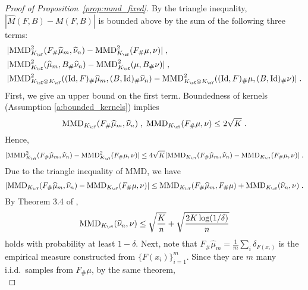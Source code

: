 \documentclass[11pt]{article}
\begin{document}
\begin{proof}[Proof of Proposition~\ref{prop:mmd_fixed}]
	By the triangle inequality, $|\widehat{M}(F, B) - M(F, B)|$ is bounded above by the sum of the following three terms:
	\begin{align*}
		& |\mathrm{MMD}^2_{K_{\cY}}(F_{\#}\widehat{\mu}_m, \widehat{\nu}_n) - \mathrm{MMD}^2_{K_{\cY}}(F_{\#}\mu, \nu)| \;, \\
		& |\mathrm{MMD}^2_{K_{\cX}}(\widehat{\mu}_m, B_{\#}\widehat{\nu}_n) - \mathrm{MMD}^2_{K_{\cX}}(\mu, B_{\#} \nu)| \;, \\
		& |\mathrm{MMD}^2_{K_{\cX} \otimes K_{\cY}} ((\mathrm{Id}, F)_{\#}\widehat{\mu}_m, (B, \mathrm{Id})_{\#} \widehat{\nu}_n) - \mathrm{MMD}^2_{K_{\cX} \otimes K_{\cY}} ((\mathrm{Id}, F)_{\#}\mu, (B, \mathrm{Id})_{\#} \nu)| \;.
	\end{align*}
	First, we give an upper bound on the first term. Boundedness of kernels (Assumption \ref{a:bounded_kernels}) implies
	\begin{equation*}
		\mathrm{MMD}_{K_{\cY}}(F_{\#}\widehat{\mu}_m, \widehat{\nu}_n) \;, \; \mathrm{MMD}_{K_{\cY}}(F_{\#}\mu, \nu) \le 2 \sqrt{K} \;.
	\end{equation*}
	Hence,
	\begin{equation*}
		|\mathrm{MMD}^2_{K_{\cY}}(F_{\#}\widehat{\mu}_m, \widehat{\nu}_n) - \mathrm{MMD}^2_{K_{\cY}}(F_{\#}\mu, \nu)| \le 4 \sqrt{K} |\mathrm{MMD}_{K_{\cY}}(F_{\#}\widehat{\mu}_m, \widehat{\nu}_n) - \mathrm{MMD}_{K_{\cY}}(F_{\#}\mu, \nu)|\;.
	\end{equation*}
	Due to the triangle inequality of MMD, we have
	\begin{equation*}
		|\mathrm{MMD}_{K_{\cY}}(F_{\#}\widehat{\mu}_m, \widehat{\nu}_n) - \mathrm{MMD}_{K_{\cY}}(F_{\#}\mu, \nu)|
		\le \mathrm{MMD}_{K_{\cY}}(F_{\#}\widehat{\mu}_{m}, F_{\#}\mu) + \mathrm{MMD}_{K_{\cY}}(\widehat{\nu}_n, \nu)\;.
	\end{equation*}
	By Theorem 3.4 of \cite{muandet_fukumizu_sriperumbudur_scholkopf_2017},
	\begin{equation*}
		\mathrm{MMD}_{K_{\cY}}(\widehat{\nu}_n, \nu) \le \sqrt{\frac{K}{n}} + \sqrt{\frac{2 K \log(1/\delta)}{n}}
	\end{equation*}
	holds with probability at least $1 - \delta$. Next, note that $F_{\#}\widehat{\mu}_m = \frac{1}{m} \sum_{i} \delta_{F(x_i)}$ is the empirical measure constructed from $\{F(x_i)\}_{i = 1}^{m}$. Since they are $m$ many i.i.d.\ samples from $F_{\#}\mu$, by the same theorem, 
	\begin{equation*}

\end{equation*}
\end{proof}
\end{document}
